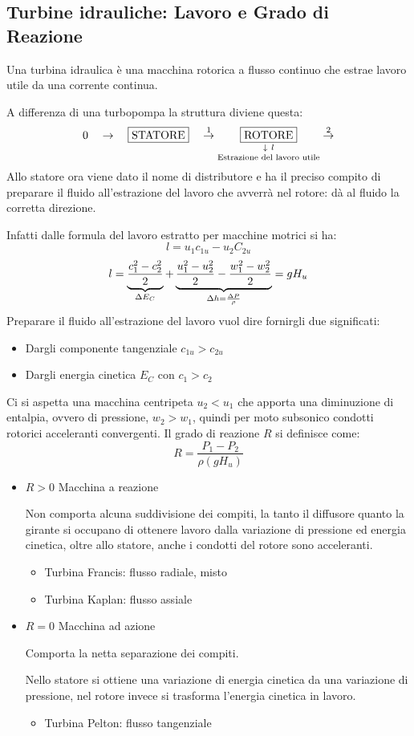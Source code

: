 \documentclass[a4paper, 15pt]{article}
\begin{document}
\subsection{Turbine idrauliche: Lavoro e Grado di Reazione}
\begin{adjustwidth}{2in}{}
	Una turbina idraulica è una macchina rotorica a flusso continuo che estrae lavoro utile da una corrente continua. \newline
	
	A differenza di una turbopompa la struttura diviene questa:
	\[0\quad\rightarrow\quad\boxed{\text{STATORE}}\quad\overset{1}{\rightarrow}\underset{\text{\mbox{Estrazione del lavoro utile}}}{\underset{\downarrow~l}{\boxed{\text{ROTORE}}}}\overset{2}{\rightarrow}\]
	Allo statore ora viene dato il nome di distributore e ha il preciso compito di preparare il fluido all'estrazione del lavoro che avverrà nel rotore: dà al fluido la corretta direzione. 
	
	Infatti dalle formula del lavoro estratto per macchine motrici si ha: 
	\[l = u_1c_{1u} - u_2C_{2u}\]
	\[l = \underbrace{\dfrac{c_1^2-c_2^2}{2}}_{\Delta E_C} + \underbrace{\dfrac{u_1^2-u_2^2}{2} - \dfrac{w_1^2-w_2^2}{2}}_{\Delta h = {\Delta P\over\rho}} = gH_u\]
	Preparare il fluido all'estrazione del lavoro vuol dire fornirgli due significati: 
	\begin{itemize}
		\item Dargli componente tangenziale $c_{1u}>c_{2u}$
		\item Dargli energia cinetica $E_C$ con $c_1>c_2$
	\end{itemize}  
	Ci si aspetta una macchina centripeta $u_2<u_1$ che apporta una diminuzione di entalpia, ovvero di pressione, $w_2>w_1$, quindi per moto subsonico condotti rotorici acceleranti convergenti.  
\newpage	
	Il grado di reazione $R$ si definisce come:
	\[R = \dfrac{P_1-P_2}{\rho(gH_u)}\]
	\begin{itemize}
		\item $R>0$ Macchina a reazione
		
		Non comporta alcuna suddivisione dei compiti, la tanto il diffusore quanto la girante si occupano di ottenere lavoro dalla variazione di pressione ed energia cinetica, oltre allo statore, anche i condotti del rotore sono acceleranti. 
		\begin{itemize}
			\item Turbina Francis: flusso radiale, misto
			\item Turbina Kaplan: flusso assiale
		\end{itemize}
		\item $R=0$ Macchina ad azione
		
		Comporta la netta separazione dei compiti. 
		
		Nello statore si ottiene una variazione di energia cinetica da una variazione di pressione, nel rotore invece si trasforma l'energia cinetica in lavoro.  
		\begin{itemize}
			\item Turbina Pelton: flusso tangenziale
		\end{itemize}
	\end{itemize}	
\end{adjustwidth}		
\end{document}
